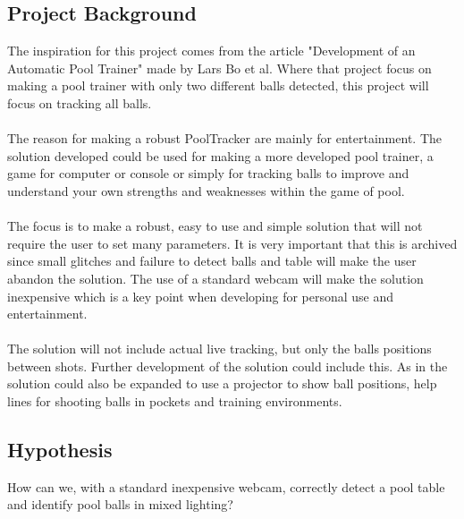 \subsection{Project Background}
The inspiration for this project comes from the article "Development of an Automatic Pool Trainer"\cite{larsbopool} made by Lars Bo et al. Where that project focus on making a pool trainer with only two different balls detected, this project will focus on tracking all balls. 
\\\\
The reason for making a robust PoolTracker are mainly for entertainment. The solution developed could be used for making a more developed pool trainer, a game for computer or console or simply for tracking balls to improve and understand your own strengths and weaknesses within the game of pool.
\\\\
The focus is to make a robust, easy to use and simple solution that will not require the user to set many parameters. It is very important that this is archived since small glitches and failure to detect balls and table will make the user abandon the solution. The use of a standard webcam will make the solution inexpensive which is a key point when developing for personal use and entertainment.
\\\\
The solution will not include actual live tracking, but only the balls positions between shots. Further development of the solution could include this. As in \cite{larsbopool} the solution could also be expanded to use a projector to show ball positions, help lines for shooting balls in pockets and training environments. 

\subsection{Hypothesis}
How can we, with a standard inexpensive webcam, correctly detect a pool table and identify pool balls in mixed lighting?